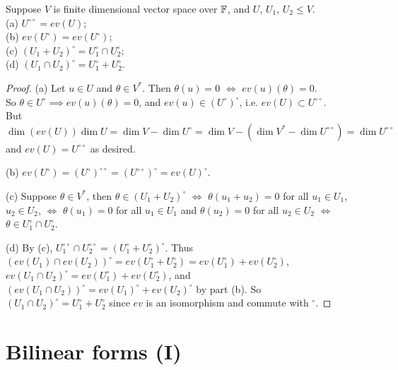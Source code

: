 \documentclass[a4paper]{article}
\begin{document}
\begin{prop}
Suppose $V$ is finite dimensional vector space over $\mathbb{F}$, and $U$, $U_1$, $U_2 \leq V$.\\
(a) $U^{\circ\circ} = ev\left(U\right)$;\\
(b) $ev\left(U^\circ\right) = ev\left(U^\circ\right)$;\\
(c) $\left(U_1+U_2\right)^\circ = U_1^\circ \cap U_2^\circ$;\\
(d) $\left(U_1\cap U_2\right)^\circ = U_1^\circ + U_2^\circ$.
\begin{proof}
(a) Let $u \in U$ and $\theta \in V^*$. Then $\theta\left(u\right) = 0$ $\iff$ $ev\left(u\right) \left(\theta\right) = 0$.\\
So $\theta \in U^\circ \implies ev\left(u\right)\left(\theta\right) = 0$, and $ev\left(u\right) \in \left(U^\circ\right)^\circ$, i.e. $ev \left(U\right) \subset U^{\circ\circ}$.\\
But $\dim \left(ev\left(U\right)\right) \dim U = \dim V - \dim U^\circ = \dim V - \left(\dim V^* - \dim U^{\circ\circ}\right) = \dim U^{\circ\circ}$
and $ev\left(U\right) = U^{\circ\circ}$ as desired.

(b) $ev\left(U^\circ\right) = \left(U^\circ\right)^{\circ\circ} = \left(U^{\circ\circ}\right)^\circ = ev\left(U\right)^\circ$.

(c) Suppose $\theta \in V^*$, then $\theta \in \left(U_1 + U_2\right)^\circ$ $\iff$ $\theta\left(u_1+u_2\right) = 0$ for all $u_1 \in U_1$, $u_2 \in U_2$, $\iff$ $\theta\left(u_1\right) = 0$ for all $u_1 \in U_1$ and $\theta\left(u_2\right) = 0$ for all $u_2 \in U_2$ $\iff$ $\theta \in U_1^\circ \cap U_2^\circ$.

(d) By (c), $U_1^{\circ\circ} \cap U_2^{\circ\circ} = \left(U_1^\circ+U_2^\circ\right)^\circ$. Thus $\left(ev\left(U_1\right) \cap ev\left(U_2\right)\right)^\circ = ev\left(U_1^\circ + U_2^\circ\right) = ev\left(U_1^\circ\right) + ev\left(U_2^\circ\right)$, $ev\left(U_1 \cap U_2\right)^\circ = ev\left(U_1^\circ\right) + ev\left(U_2^\circ\right)$, and $\left(ev\left(U_1 \cap U_2\right)\right)^\circ = ev\left(U_1\right)^\circ + ev\left(U_2\right)^\circ$ by part (b). So $\left(U_1\cap U_2\right)^\circ = U_1^\circ + U_2^\circ$ since $ev$ is an isomorphism and commute with $^\circ$.
\end{proof}
\end{prop}

\newpage

\section{Bilinear forms (I)}
\end{document}
